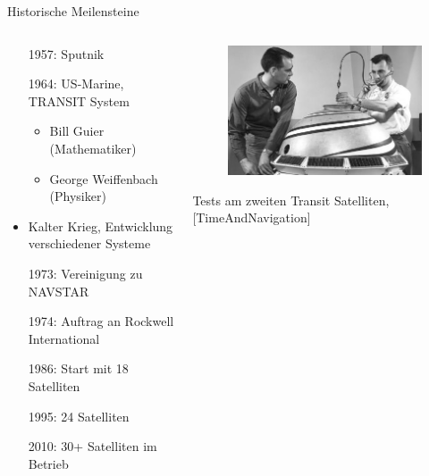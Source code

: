 \begin{frame}{Historische Meilensteine}
    \begin{columns}
        \begin{column}{0.5\textwidth}
            \begin{itemize}
                \item[1957:] Sputnik
                \item[1964:] US-Marine, TRANSIT System
                \begin{itemize}
                    \item Bill Guier (Mathematiker)
                    \item George Weiffenbach (Physiker)
                \end{itemize}
                \item Kalter Krieg, Entwicklung verschiedener Systeme
                \item[1973:] Vereinigung zu NAVSTAR
                \item[1974:] Auftrag an Rockwell International
                \item[1986:] Start mit 18 Satelliten
                \item[1995:] 24 Satelliten
                \item[2010:] 30+ Satelliten im Betrieb
            \end{itemize}
        \end{column}
        \begin{column}{0.35\textwidth}
            \begin{figure}
                \centering
                \includegraphics[width=0.35\paperwidth]{images/transit-satellite.jpg}
            \end{figure}
            Tests am zweiten Transit Satelliten, {\small [TimeAndNavigation]}
        \end{column}
    \end{columns}
\end{frame}
